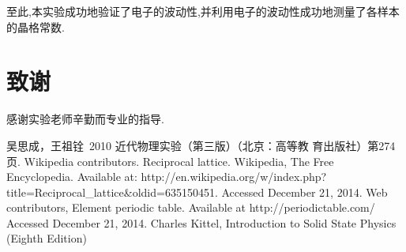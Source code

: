 \documentclass[aps,pre,12pt,preprint,onecolumn,showpacs,showkeys]{revtex4-1}
\begin{document}
至此,本实验成功地验证了电子的波动性,并利用电子的波动性成功地测量了各样本的晶格常数.

\section{致谢}
 
感谢实验老师辛勤而专业的指导.

\begin{thebibliography}{}
 吴思成，王祖铨~2010 近代物理实验（第三版）（北京：高等教
育出版社）第274页.
Wikipedia contributors. Reciprocal lattice. Wikipedia, The Free
Encyclopedia. Available at:
http://en.wikipedia.org/w/index.php?title=Reciprocal\_lattice\&oldid=635150451.
Accessed December 21, 2014.
Web contributors, Element periodic table. Available at
http://periodictable.com/ Accessed December 21, 2014.
Charles Kittel, Introduction to Solid State Physics (Eighth
Edition)

\end{thebibliography}
 
\end{document}
